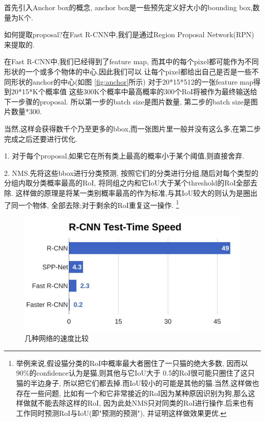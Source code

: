首先引入Anchor box的概念, anchor box是一些预先定义好大小的bounding box,数量为K个.

如何提取proposal?在Fast R-CNN中,我们是通过Region Proposal Network(RPN)来提取的.

在Fast R-CNN中,我们已经得到了feature map,
而其中的每个pixel都可能作为不同形状的一个或多个物体的中心,因此我们可以
让每个pixel都给出自己是否是一些不同形状的anchor的中心(如图 \ref{fig:anchor}所示)
对于20*15*512的一张feature map得到20*15*K个概率值
这些300K个概率中最高概率的300个RoI将被作为最终输送给下一步骤的proposal.
所以第一步的batch size是图片数量, 第二步的batch size是图片数量*300.


当然,这样会获得数千个乃至更多的bbox,而一张图片里一般并没有这么多,在第二步完成之后还要进行优化.

1. 对于每个proposal,如果它在所有类上最高的概率小于某个阈值,则直接舍弃.

2. NMS.先将这些bbox进行分类预测,
按照它们的分类进行分组,随后对每个类型的分组内取分类概率最高的RoI,
将同组之内和它IoU大于某个threshold的RoI全部去除.
这样做的原理是将某一类别概率最高的作为标准,与其IoU较大的则认为是圈出了同一个物体,
全部去除;对于剩余的RoI重复这一操作.
\footnote{举例来说,假设猫分类的RoI中概率最大者圈住了一只猫的绝大多数,
因而以90\%的confidence认为是猫,则其他与它IoU大于
0.5的RoI很可能只圈住了这只猫的半边身子,
所以把它们都去掉.而IoU较小的可能是其他的猫.当然,这样做也存在一些问题,
比如有一个和它非常接近的RoI因为某种原因识别为狗,那么这样做就不能去除这样的RoI,
因为此处NMS只对同类的RoI进行操作.后来也有工作同时预测RoI与IoU(即"预测的预测"),
并证明这样做效果更优.}

\begin{figure}
    \includegraphics[scale=0.4]{figures/rcnn_speed_comparison.png}
    \caption{几种网络的速度比较}
    \label{fig:rcnn_speed}
\end{figure}

